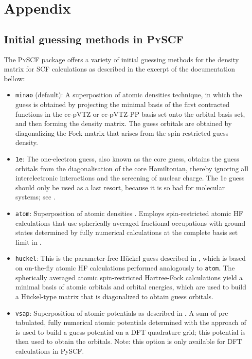 \appendix
\chapter{Appendix}
\label{sec:appendix}

\section{Initial guessing methods in \textsc{PySCF} \parencite{ref:pyscf}}
\label{sec:pyscf_initial_guessing_methods}
The \textsc{PySCF} package offers a variety of initial guessing methods for the density matrix for SCF calculations as described in the excerpt of the documentation \parencite{ref:pyscf_user_guide} bellow: 
\begin{itemize}
    \item \texttt{minao} (default): A superposition of atomic densities \parencite{ref:minao_sad1,ref:minao_sad2} technique, in which the guess is obtained by projecting the minimal basis of the first contracted functions in the cc-pVTZ or cc-pVTZ-PP basis set onto the orbital basis set, and then forming the density matrix. The guess orbitals are obtained by diagonalizing the Fock matrix that arises from the spin-restricted guess density.

    \item \texttt{1e}: The one-electron guess, also known as the core guess, obtains the guess orbitals from the diagonalisation of the core Hamiltonian, thereby ignoring all interelectronic interactions and the screening of nuclear charge. The 1e guess should only be used as a last resort, because it is so bad for molecular systems; see \parencite{ref:Lehtola2019}.

    \item \texttt{atom}: Superposition of atomic densities \parencite{ref:minao_sad1,ref:minao_sad2}. Employs spin-restricted atomic HF calculations that use spherically averaged fractional occupations with ground states determined by fully numerical calculations at the complete basis set limit in \parencite{ref:lethola_fully_numerical_atomic_potentials}.

    \item \texttt{huckel}: This is the parameter-free Hückel guess described in \parencite{ref:Lehtola2019}, which is based on on-the-fly atomic HF calculations performed analogously to \texttt{atom}. The spherically averaged atomic spin-restricted Hartree-Fock calculations yield a minimal basis of atomic orbitals and orbital energies, which are used to build a Hückel-type matrix that is diagonalized to obtain guess orbitals.

    \item \texttt{vsap}: Superposition of atomic potentials as described in \parencite{ref:Lehtola2019}. A sum of pre-tabulated, fully numerical atomic potentials determined with the approach of \parencite{ref:lethola_fully_numerical_atomic_potentials} is used to build a guess potential on a DFT quadrature grid; this potential is then used to obtain the orbitals. Note: this option is only available for DFT calculations in PySCF.
\end{itemize}
